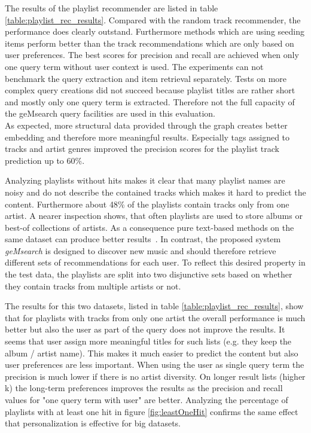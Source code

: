 \documentclass[sigconf]{acmart}
\begin{document}
The results of the playlist recommender are listed in table \ref{table:playlist_rec_results}. Compared with the random track recommender, the performance does clearly outstand. Furthermore methods which are using seeding items perform better than the track recommendations which are only based on user preferences. The best scores for precision and recall are achieved when only one query term without user context is used. The experiments can not benchmark the query extraction and item retrieval separately. Tests on more complex query creations did not succeed because playlist titles are rather short and mostly only one query term is extracted. Therefore not the full capacity of the geMsearch query facilities are used in this evaluation.  \\


As expected, more structural data provided through the graph creates better embedding and therefore more meaningful results. Especially tags assigned to tracks and artist genres improved the precision scores for the playlist track prediction up to 60\%.


Analyzing playlists without hits makes it clear that many playlist names are noisy and do not describe the contained tracks which makes it hard to predict the content. Furthermore about 48\% of the playlists contain tracks only from one artist. A nearer inspection shows, that often playlists are used to store albums or best-of collections of artists. As a consequence pure text-based methods on the same dataset can produce better results~\cite{chungexploiting}. In contrast, the proposed system \emph{geMsearch} is designed to discover new music and should therefore retrieve different sets of recommendations for each user. To reflect this desired property in the test data, the playlists are split into two disjunctive sets based on whether they contain tracks from multiple artists or not.

The results for this two datasets, listed in table \ref{table:playlist_rec_results}, show that for playlists with tracks from only one artist the overall performance is much better but also the user as part of the query does not improve the results. It seems that user assign more meaningful titles for such lists (e.g. they keep the album / artist name). This makes it much easier to predict the content but also user preferences are less important. When using the user as single query term the precision is much lower if there is no artist diversity. On longer result lists (higher k) the long-term preferences improves the results as the precision and recall values for "one query term with user" are better. Analyzing the percentage of playlists with at least one hit in figure \ref{fig:leastOneHit} confirms the same effect that personalization is effective for big datasets.
\end{document}
